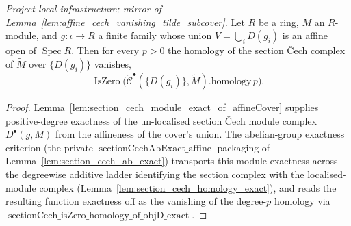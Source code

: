 \begin{lemma}\leanok
  \label{lem:sectionCech_homology_exact_of_affineCover}
  \textit{Project-local infrastructure; mirror of
  Lemma~\ref{lem:affine_cech_vanishing_tilde_subcover}.}
  Let \(R\) be a ring, \(M\) an \(R\)-module, and \(g : \iota \to R\) a finite family whose union
  \(V = \bigcup_i D(g_i)\) is an affine open of \(\operatorname{Spec} R\). Then for every \(p > 0\) the
  homology of the section {\v C}ech complex of \(\widetilde{M}\) over \(\{D(g_i)\}\) vanishes,
  \[
    \operatorname{IsZero}\bigl(\check{\mathcal{C}}^\bullet(\{D(g_i)\}, \widetilde{M}).\mathrm{homology}\, p\bigr).
  \]
\end{lemma}
\begin{proof}
  \leanok
  Lemma~\ref{lem:section_cech_module_exact_of_affineCover} supplies positive-degree exactness of the
  un-localised section {\v C}ech module complex \(D^\bullet(g, M)\) from the affineness of the cover's
  union. The abelian-group exactness criterion (the private \(\operatorname{sectionCechAbExact\_affine}\)
  packaging of Lemma~\ref{lem:section_cech_ab_exact}) transports this module exactness across the
  degreewise additive ladder identifying the section complex with the localised-module complex
  (Lemma~\ref{lem:section_cech_homology_exact}), and reads the resulting function exactness off as the
  vanishing of the degree-\(p\) homology via
  \(\operatorname{sectionCech\_isZero\_homology\_of\_objD\_exact}\).
\end{proof}

